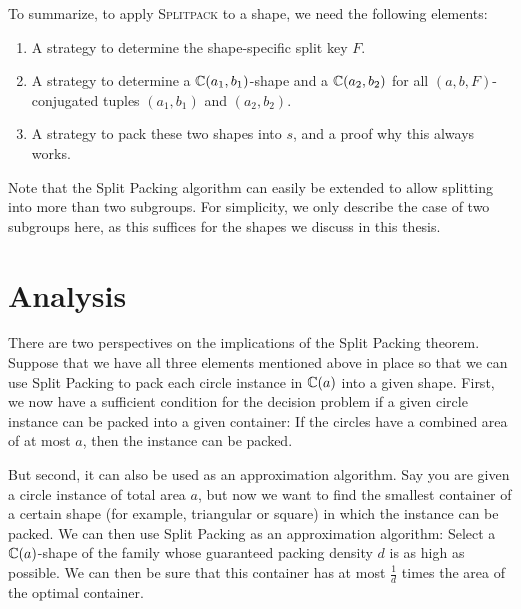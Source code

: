 \documentclass[a4paper,style=print,bibliography=totoc,nexus,lnum,extramargin]{tubsbook}
\begin{document}
To summarize, to apply \textsc{Splitpack} to a shape, we need the following elements:

\begin{enumerate}
    \item A strategy to determine the shape-specific split key $F$.
    \item A strategy to determine a $\mathbb{C}(a_1, b_1)$-shape and a $\mathbb{C}(a_2, b_2)$ for all $(a,b,F)$-conjugated tuples $(a_1, b_1)$ and $(a_2, b_2)$.
    \item A strategy to pack these two shapes into $s$, and a proof why this always works.
\end{enumerate}

Note that the Split Packing algorithm can easily be extended to allow splitting into more than two subgroups. For simplicity, we only describe the case of two subgroups here, as this suffices for the shapes we discuss in this thesis.



\section{Analysis}

There are two perspectives on the implications of the Split Packing theorem. Suppose that we have all three elements mentioned above in place so that we can use Split Packing to pack each circle instance in $\mathbb{C}(a)$ into a given shape.
First, we now have a sufficient condition for the decision problem if a given circle instance can be packed into a given container: If the circles have a combined area of at most $a$, then the instance can be packed.

But second, it can also be used as an approximation algorithm. Say you are given a circle instance of total area $a$, but now we want to find the smallest container of a certain shape (for example, triangular or square) in which the instance can be packed. We can then use Split Packing as an approximation algorithm: Select a $\mathbb{C}(a)$-shape of the family whose guaranteed packing density $d$ is as high as possible. We can then be sure that this container has at most $\frac{1}{d}$ times the area of the optimal container.
\end{document}
